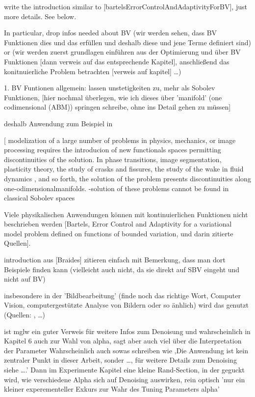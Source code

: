 write the introduction similar to
[bartelsErrorControlAndAdaptivityForBV], just more details. See below.

In particular, drop infos needed about BV (wir werden sehen, dass BV Funktionen
dies und das erfüllen und deshalb diese und jene Terme definiert sind)
or (wir werden zuerst grundlagen einführen aus der Optimierung und über BV 
Funktionen [dann verweis auf das entsprechende Kapitel], anschließend
das konitnuierliche Problem betrachten [verweis auf kapitel] \ldots)
\bigskip

1. BV Funtionen allgemein: lassen unstetigkeiten zu, mehr als Sobolev 
Funktionen,
[hier nochmal überlegen, wie ich dieses über 'manifold' (one codimensional
(ABM)) springen schreibe, ohne ins Detail gehen zu müssen]
\medskip

deshalb Anwendung zum Beispiel in
\medskip

[\cite{ABM14} modelization of a large number of problems in physics, mechanics,
or image processing requires the introducion of new functionals spaces
permitting discontinuities of the solution. In phase transitions, image
segmentation, plasticity theory, the study of crasks and fissures, the study of
the wake in fluid dynamics , and so forth, the solution of the problem presents
discontinuities along one-odimensionalmanifolds.
-solution of these problems cannot be found in classical Sobolev spaces
\medskip

Viele physikalischen Anwendungen können mit kontinuierlichen Funktionen nicht
beschrieben werden [Bartels, Error Control and Adaptivity for a variational
model problem defined on functions of bounded variation, und darin zitierte
Quellen].
\medskip

introduction aus [Braides] zitieren einfach mit Bemerkung, dass man dort
Beispiele finden kann (vielleicht auch nicht, da sie direkt auf SBV
eingeht und nicht auf BV)
\medskip

insbesondere in der 'Bildbearbeitung' (finde
noch das richtige Wort, Computer Vision, computergestützte Analyse von Bildern
oder so änhlich) wird das genutzt
(Quellen: \cite{AK06}, \ldots)

\cite{Get12} ist mglw ein guter Verweis für weitere Infos zum Denoisung und
wahrscheinlich in Kapitel 6 auch zur Wahl von alpha, sagt
aber auch viel über die Interpretation der Parameter
Wahrscheinlich auch sowas schreiben wie ,Die Anwendung ist kein zentraler
Punkt in dieser Arbeit, sonder \ldots, für weitere Details zum Denoising siehe
\ldots.' Dann im Experimente Kapitel eine kleine Rand-Section, in der geguckt
wird, wie verschiedene Alpha sich auf Denoising auswirken, rein optisch 'nur
ein kleiner experementeller Exkurs zur Wahr des Tuning Parameters alpha'

